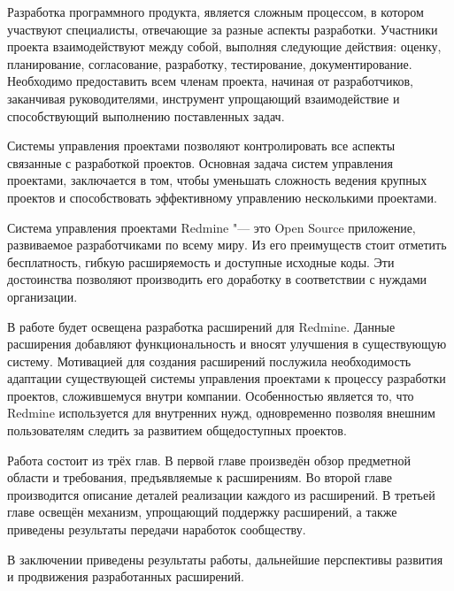 Разработка программного продукта, является сложным процессом, в котором
участвуют специалисты, отвечающие за разные аспекты разработки. Участники
проекта взаимодействуют между собой, выполняя следующие действия: оценку,
планирование, согласование, разработку, тестирование, документирование. 
 Необходимо предоставить всем членам
проекта, начиная от разработчиков, заканчивая руководителями, инструмент
упрощающий взаимодействие и способствующий выполнению поставленных
задач.

Системы управления проектами позволяют контролировать все аспекты связанные с
разработкой проектов. Основная задача систем управления проектами, заключается в
том, чтобы уменьшать сложность ведения крупных проектов и способствовать
эффективному управлению несколькими проектами.

Система управления проектами Redmine "--- это Open Source приложение,
развиваемое разработчиками по всему миру. Из его преимуществ стоит
отметить бесплатность, гибкую расширяемость и доступные исходные коды. Эти
достоинства позволяют производить его доработку в соответствии с нуждами
организации.

В работе будет освещена разработка расширений для Redmine. Данные расширения
добавляют функциональность и вносят улучшения в существующую систему.
Мотивацией для создания расширений послужила необходимость адаптации
существующей системы управления проектами к процессу разработки проектов,
сложившемуся внутри компании.  Особенностью является то, что Redmine используется для
внутренних нужд, одновременно позволяя внешним пользователям следить за
развитием общедоступных проектов. 

Работа состоит из трёх глав. В первой главе произведён обзор предметной области
и требования, предъявляемые к расширениям. Во второй главе производится
описание деталей реализации каждого из расширений. В третьей главе освещён
механизм, упрощающий поддержку расширений, а также приведены результаты
передачи наработок сообществу.

В заключении приведены результаты работы, дальнейшие перспективы развития и
продвижения разработанных расширений.

